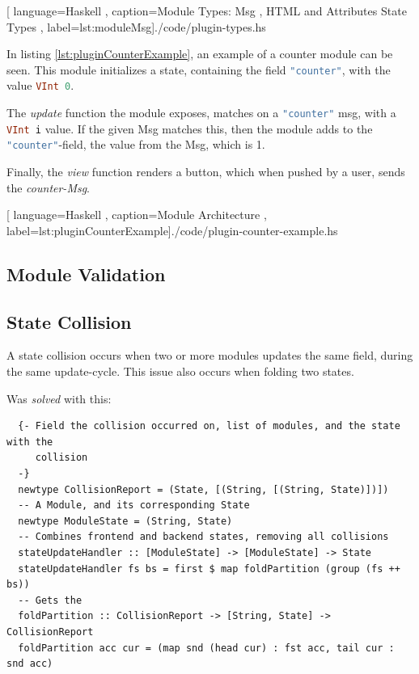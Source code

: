 \begin{center}
  \centering
  
    [ language=Haskell
    , caption={Module Types: Msg
    , HTML and Attributes State Types}
    , label=lst:moduleMsg]{./code/plugin-types.hs}
\end{center}

In listing \ref{lst:pluginCounterExample}, an example of a counter module can be
seen. This module initializes a state, containing the field
\lstinline[language=Haskell]{"counter"}, with the value
\lstinline[language=Haskell]{VInt 0}.

The \textit{update} function the module exposes, matches on a
\lstinline[language=Haskell]{"counter"} msg, with a
\lstinline[language=Haskell]{VInt i} value. If the given Msg matches this, then
the module adds to the \lstinline[language=Haskell]{"counter"}-field, the value
from the Msg, which is 1.

Finally, the \textit{view} function renders a button, which when pushed by a
user, sends the \textit{counter-Msg}.

\begin{center}
  
    [ language=Haskell
    , caption={Module Architecture}
    , label=lst:pluginCounterExample]{./code/plugin-counter-example.hs}
\end{center}

\subsection{Module Validation}


\subsection{State Collision}

A state collision occurs when two or more modules updates the same field, during
the same update-cycle. This issue also occurs when folding two states.

Was \textit{solved} with this:

\begin{verbatim}
  {- Field the collision occurred on, list of modules, and the state with the
     collision
  -}
  newtype CollisionReport = (State, [(String, [(String, State)])])
  -- A Module, and its corresponding State
  newtype ModuleState = (String, State)
  -- Combines frontend and backend states, removing all collisions
  stateUpdateHandler :: [ModuleState] -> [ModuleState] -> State
  stateUpdateHandler fs bs = first $ map foldPartition (group (fs ++ bs))
  -- Gets the
  foldPartition :: CollisionReport -> [String, State] -> CollisionReport
  foldPartition acc cur = (map snd (head cur) : fst acc, tail cur : snd acc)
\end{verbatim}

